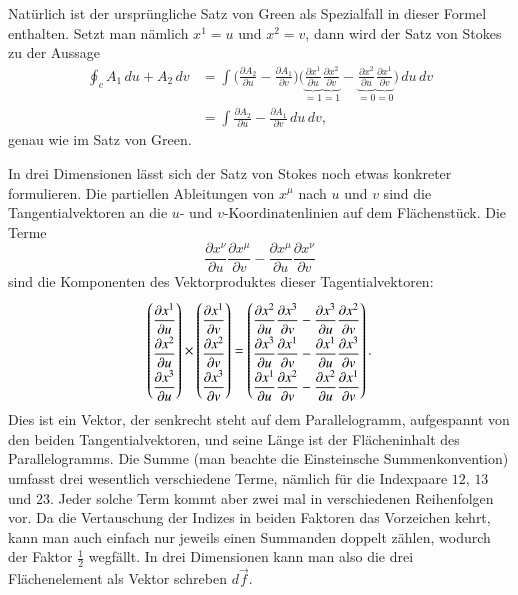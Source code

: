 Natürlich ist der ursprüngliche Satz von Green als Spezialfall in dieser
Formel enthalten.
Setzt man nämlich $x^1=u$ und $x^2=v$, dann wird der Satz von Stokes zu
der Aussage
\begin{align*}
\oint_c A_1\,du + A_2\,dv
&=
\int
\biggl(
\frac{\partial A_2}{\partial u}-\frac{\partial A_1}{\partial v}
\biggr)
\biggl(
\underbrace{\frac{\partial x^1}{\partial u}}_{=1}
\underbrace{\frac{\partial x^2}{\partial v}}_{=1}
-
\underbrace{\frac{\partial x^2}{\partial u}}_{=0}
\underbrace{\frac{\partial x^1}{\partial v}}_{=0}
\biggr)
\,du\,dv
\\
&=
\int
\frac{\partial A_2}{\partial u}-\frac{\partial A_1}{\partial v}
\,du\,dv,
\end{align*}
genau wie im Satz von Green.

In drei Dimensionen lässt sich der Satz von Stokes noch etwas konkreter
formulieren.
Die partiellen Ableitungen von $x^\mu$ nach $u$ und $v$ sind die 
Tangentialvektoren an die $u$- und $v$-Koordinatenlinien auf dem 
Flächenstück.
Die Terme
\[
\frac{\partial x^\nu}{\partial u} \frac{\partial x^\mu}{\partial v}
-
\frac{\partial x^\mu}{\partial u} \frac{\partial x^\nu}{\partial v}
\]
sind die Komponenten des Vektorproduktes dieser Tagentialvektoren:
\[
\def\arraystretch{2.0}
\begin{pmatrix}
\displaystyle \frac{\partial x^1}{\partial u}\\
\displaystyle \frac{\partial x^2}{\partial u}\\
\displaystyle \frac{\partial x^3}{\partial u}
\end{pmatrix}
\times
\begin{pmatrix}
\displaystyle \frac{\partial x^1}{\partial v}\\
\displaystyle \frac{\partial x^2}{\partial v}\\
\displaystyle \frac{\partial x^3}{\partial v}
\end{pmatrix}
=
\begin{pmatrix}
\displaystyle
\frac{\partial x^2}{\partial u}\frac{\partial x^3}{\partial v}
-
\frac{\partial x^3}{\partial u}\frac{\partial x^2}{\partial v}
\\
\displaystyle
\frac{\partial x^3}{\partial u}\frac{\partial x^1}{\partial v}
-
\frac{\partial x^1}{\partial u}\frac{\partial x^3}{\partial v}
\\
\displaystyle
\frac{\partial x^1}{\partial u}\frac{\partial x^2}{\partial v}
-
\frac{\partial x^2}{\partial u}\frac{\partial x^1}{\partial v}
\end{pmatrix}.
\]
Dies ist ein Vektor, der senkrecht steht auf dem Parallelogramm,
aufgespannt von den beiden Tangentialvektoren, und seine Länge ist
der Flächeninhalt des Parallelogramms.
Die Summe (man beachte die Einsteinsche Summenkonvention) umfasst
drei wesentlich verschiedene Terme, nämlich für die Indexpaare
$12$, $13$ und $23$.
Jeder solche Term kommt aber zwei mal in verschiedenen Reihenfolgen
vor.
Da die Vertauschung der Indizes in beiden Faktoren das Vorzeichen 
kehrt, kann man auch einfach nur jeweils einen Summanden doppelt
zählen, wodurch der Faktor $\frac12$ wegfällt.
In drei Dimensionen kann man also die drei Flächenelement als Vektor
schreben $d\vec f$.

